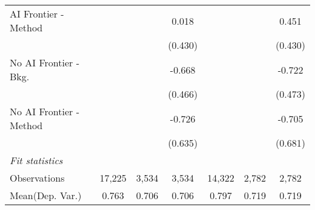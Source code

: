 \begin{tabular}{lcccccc}
   AI Frontier - Method    &              &              & 0.018         &               &              & 0.451\\   
                           &              &              & (0.430)       &               &              & (0.430)\\   
   No AI Frontier - Bkg.   &              &              & -0.668        &               &              & -0.722\\   
                           &              &              & (0.466)       &               &              & (0.473)\\   
   No AI Frontier - Method &              &              & -0.726        &               &              & -0.705\\   
                           &              &              & (0.635)       &               &              & (0.681)\\   
   \midrule
   \emph{Fit statistics}\\
   Observations            & 17,225       & 3,534        & 3,534         & 14,322        & 2,782        & 2,782\\  
Mean(Dep. Var.) & 0.763 & 0.706 & 0.706 & 0.797 & 0.719 & 0.719 \\
   

\end{tabular}
